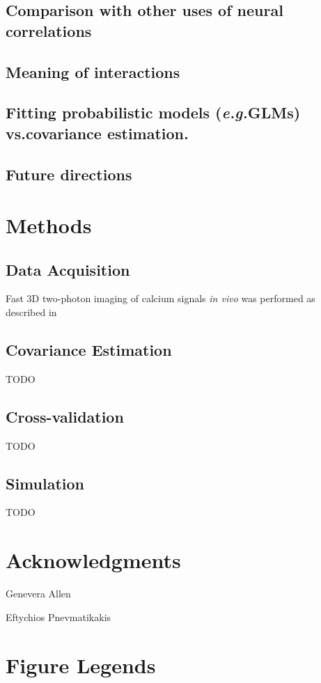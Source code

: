 \documentclass[10pt]{article}
\begin{document}
\subsection*{Comparison with other uses of neural correlations}
\subsection*{Meaning of interactions}
\subsection*{Fitting probabilistic models (\emph{e.g.}\;GLMs) vs.\;covariance estimation.}
\subsection*{Future directions}

\section*{Methods}
\subsection*{Data Acquisition}
Fast 3D two-photon imaging of calcium signals \emph{in vivo} was performed as described in \cite{Cotton:2013}
\subsection*{Covariance Estimation}
TODO
\subsection*{Cross-validation}
TODO
\subsection*{Simulation}
TODO

\section*{Acknowledgments}
Genevera Allen

Eftychios Pnevmatikakis 




\section*{Figure Legends}
\end{document}
